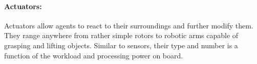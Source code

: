 {\paragraph{Actuators:} Actuators allow agents to react to their surroundings and further modify them. They range anywhere from rather simple rotors to robotic arms capable of grasping and lifting objects. Similar to sensors, their type and number is a function of the workload and processing power on board.

}
